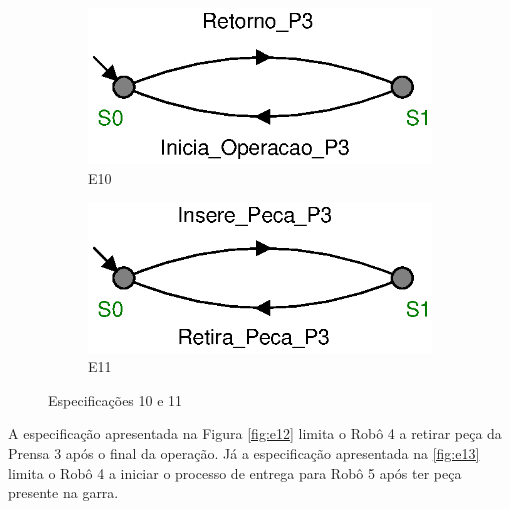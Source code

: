 \begin{figure}[H]%
  \centering
  \begin{subfigure}{0.45\textwidth}
      \centering
      \includegraphics[width=\textwidth]{imagens/E10.eps}
      \caption{E10}
      \label{fig:e10}
  \end{subfigure}
  \hfill
  \begin{subfigure}{0.45\textwidth}
      \centering
      \includegraphics[width=\textwidth]{imagens/E11.eps}
      \caption{E11}
      \label{fig:e11}
  \end{subfigure}
  \caption{Especificações 10 e 11}
  \label{fig:e1011}
\end{figure}

A especificação apresentada na Figura \ref{fig:e12} limita o Robô 4 a retirar peça da Prensa 3 após o final da operação.
Já a especificação apresentada na \ref{fig:e13} limita o Robô 4 a iniciar o processo de entrega para Robô 5 após ter peça presente na garra.

